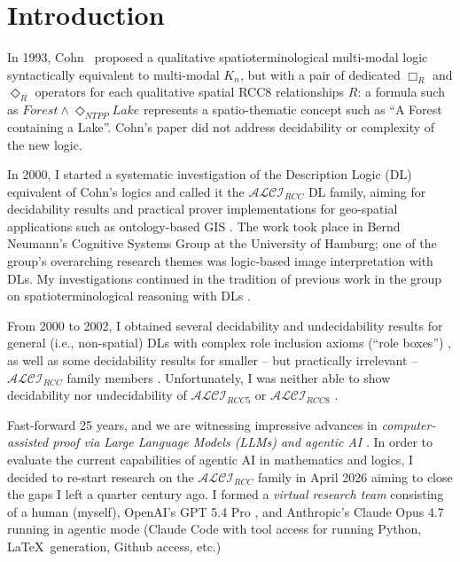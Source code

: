 \documentclass[
]{ceurart}
\theoremstyle{definition}
\newcommand{\ALCIRCC}[1]{\ensuremath{\mathcal{ALCI}_{\mathit{RCC#1}}}}
\begin{document}
\maketitle

\section{Introduction}
\label{sec:ea-intro}

In 1993, Cohn~\cite{Cohn1993} proposed a qualitative
spatioterminological multi-modal logic syntactically equivalent to
multi-modal $K_n$, but with a pair of dedicated $\Box_R$ and
$\Diamond_R$ operators for each qualitative spatial RCC8
relationships $R$: a formula such as $Forest \wedge \Diamond_{NTPP}
Lake$ represents a spatio-thematic concept such as ``A Forest
containing a Lake''. Cohn's paper did not address
decidability or complexity of the new logic.

In 2000, I started a systematic investigation of the Description Logic
(DL) equivalent of Cohn's logics and called it the $\ALCIRCC{}$ DL
family, aiming for decidability results and practical prover
implementations for geo-spatial applications such as ontology-based
GIS \cite{Wessel2003KRDB}. The work took place in Bernd Neumann's
Cognitive Systems Group at the University of Hamburg; one of the
group's overarching research themes was logic-based image
interpretation with DLs. My investigations continued in the tradition
of previous work in the group on spatioterminological reasoning with DLs
\cite{HaarslevMoellerSchroder1994,SchroderNeumann1996,
  HaarslevWessel1996GenEd, HaarslevMoeller1997SBox, MoellerWessel1999,
  HaarslevLutzMoeller1998, HaarslevLutzMoeller1999, Wessel2003KRDB}.

From 2000 to 2002, I obtained several decidability and undecidability
results for general (i.e., non-spatial) DLs with complex role
inclusion axioms (``role boxes'') \cite{Wessel2000RA,
  Wessel2000SG,Wessel2001,Wessel2001RA}, as well as some decidability
results for smaller -- but practically irrelevant -- $\ALCIRCC{}$
family members \cite{Wessel2002, Wessel2003}. Unfortunately, I was
neither able to show decidability nor undecidability of $\ALCIRCC{5}$
or $\ALCIRCC{8}$ \cite{Wessel2003}.

Fast-forward 25 years, and we are witnessing impressive advances in
\emph{computer-assisted proof via Large Language Models (LLMs) and
agentic AI} \cite{TaoKlowden2026, Knuth2026ClaudesCycles}. In order to
evaluate the current capabilities of agentic AI in mathematics and
logics, I decided to re-start research on the $\ALCIRCC{}$ family in
April 2026 aiming to close the gaps I left a quarter century ago. I
formed a \emph{virtual research team} consisting of a human (myself),
OpenAI's GPT 5.4 Pro \cite{GPT54Pro}, and Anthropic's Claude Opus 4.7
\cite{ClaudeOpus47} running in agentic mode (Claude Code with tool
access for running Python, \LaTeX\ generation, Github access, etc.)
\end{document}
